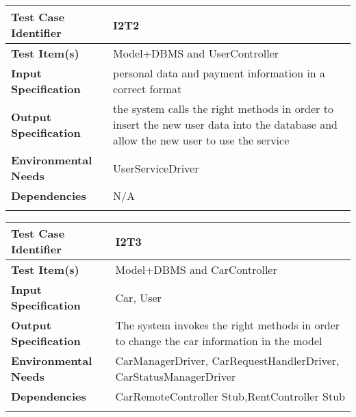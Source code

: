 
\begin{center}
\begin{tabular*}
{\textwidth}
{l p{10.5cm}}

\hline
\textbf{Test Case Identifier} & I2T2 \\
\hline
\textbf{Test Item(s)} &  Model+DBMS and UserController  \\
\hline
\textbf{Input Specification} &  personal data and payment information in a correct format\\
\hline
\textbf{Output Specification} &  the system calls the right methods in order to insert the new user data into the database and allow the new user to use the service\\
\hline
\textbf{Environmental Needs} & UserServiceDriver \\
\hline
\textbf{Dependencies} &  N/A\\%
\hline
\newline
\newline
\end{tabular*}
\end{center}




\begin{center}
\begin{tabular*}
{\textwidth}
{l p{10.5cm}}

\hline
\textbf{Test Case Identifier} & I2T3 \\
\hline
\textbf{Test Item(s)} &  Model+DBMS and CarController  \\
\hline
\textbf{Input Specification} &  Car, User\\
\hline
\textbf{Output Specification} &  The system invokes the right methods in order to change the car information in the model\\
\hline
\textbf{Environmental Needs} & CarManagerDriver, CarRequestHandlerDriver,  CarStatusManagerDriver\\
\hline
\textbf{Dependencies} &  CarRemoteController Stub,RentController Stub\\
\hline
\newline
\newline
\end{tabular*}
\end{center}




